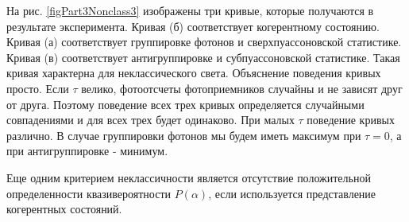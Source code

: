 

На рис. \ref{figPart3Nonclass3} изображены три кривые, которые
получаются в результате эксперимента. Кривая (б) соответствует
когерентному состоянию. Кривая (а) соответствует группировке фотонов и
сверхпуассоновской статистике. Кривая (в) соответствует
антигруппировке и субпуассоновской статистике. Такая кривая характерна
для неклассического света. Объяснение поведения кривых просто. Если
$\tau$ велико, фотоотсчеты фотоприемников случайны и не зависят друг
от друга. Поэтому поведение всех трех кривых определяется случайными
совпадениями и для всех трех будет одинаково. При малых $\tau$
поведение кривых различно. В случае группировки фотонов мы будем иметь
максимум при $\tau = 0$, а при антигруппировке - минимум.

Еще одним критерием неклассичности является отсутствие положительной
определенности квазивероятности $P\left(\alpha\right)$, если
используется представление когерентных состояний.

